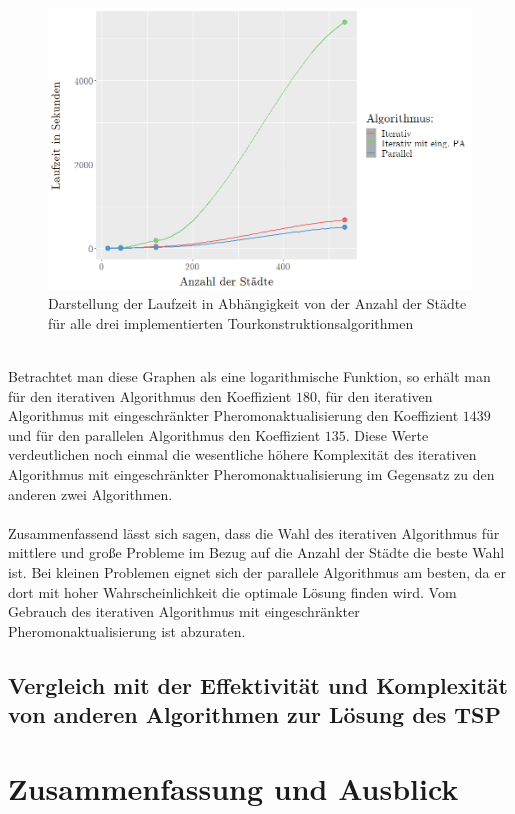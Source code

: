 \documentclass[doktyp=barbeit, sprache=german]{TUBAFarbeiten}
\begin{document}
\begin{figure}
\captionsetup{justification=centering}
  \centering
     \includegraphics[width=\textwidth]{images/diagramruntimes.png}
  \caption{Darstellung der Laufzeit in Abhängigkeit von der Anzahl der Städte für alle drei implementierten Tourkonstruktionsalgorithmen}
  \label{img:runtimecity}
\end{figure}
\\Betrachtet man diese Graphen als eine logarithmische Funktion, so erhält man für den iterativen Algorithmus den Koeffizient $180$, für den iterativen Algorithmus mit eingeschränkter Pheromonaktualisierung den Koeffizient $1439$ und für den parallelen Algorithmus den Koeffizient $135$. Diese Werte verdeutlichen noch einmal die wesentliche höhere Komplexität des iterativen Algorithmus mit eingeschränkter Pheromonaktualisierung im Gegensatz zu den anderen zwei Algorithmen.
\\\\Zusammenfassend lässt sich sagen, dass die Wahl des iterativen Algorithmus für mittlere und große Probleme im Bezug auf die Anzahl der Städte die beste Wahl ist. Bei kleinen Problemen eignet sich der parallele Algorithmus am besten, da er dort mit hoher Wahrscheinlichkeit die optimale Lösung finden wird. Vom Gebrauch des iterativen Algorithmus mit eingeschränkter Pheromonaktualisierung ist abzuraten.
\subsection{Vergleich mit der Effektivität und Komplexität von anderen Algorithmen zur Lösung des TSP}
\section{Zusammenfassung und Ausblick}
\newpage
\appendix
\end{document}
